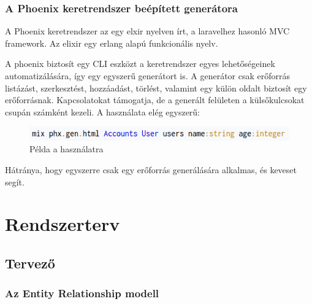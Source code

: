 \documentclass[a4paper,12pt,oneside]{report}
\begin{document}
\newpage
\subsubsection{A Phoenix keretrendszer beépített generátora}

\begin{justify}
	A Phoenix keretrendszer az egy elxir nyelven írt, a laravelhez hasonló MVC framework. Az elixir egy erlang alapú funkcionális nyelv. 

	A phoenix biztosít egy CLI eszközt a keretrendszer egyes lehetőségeinek automatizálására, így egy egyszerű generátort is. A generátor csak erőforrás listázást, szerkesztést, hozzáadást, törlést, valamint egy külön oldalt biztosít egy erőforrásnak. Kapcsolatokat támogatja, de a generált felületen a külsőkulcsokat csupán számként kezeli. A használata elég egyszerű: 

	\begin{figure}[h]
		\includegraphics[width=\textwidth]{contents/images/mix_phx_gen_html.png}
		\caption{Példa a használatra}
		\label{fig:mix_phx_gen_html}
	\end{figure}

	Hátránya, hogy egyszerre csak egy erőforrás generálására alkalmas, és keveset segít.

\end{justify}

\newpage
\section{Rendszerterv}
\subsection{Tervező}
\subsubsection{Az Entity Relationship modell}
\end{document}

